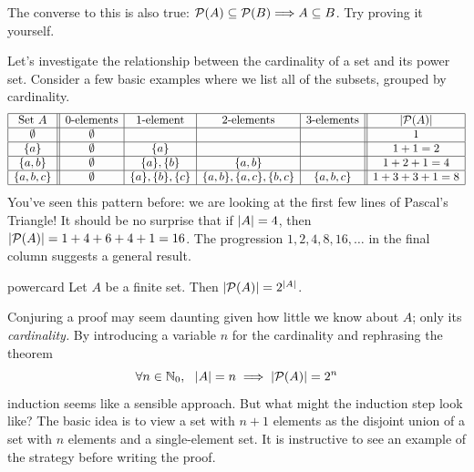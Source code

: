 The converse to this is also true: $\mathcal{P}(A)\subseteq\mathcal{P}(B)\Longrightarrow A\subseteq B$. Try proving it yourself.




Let's investigate the relationship between the cardinality of a set and its power set. Consider a few basic examples where we list all of the subsets, grouped by cardinality.
\[
	\begin{array}{|c||c|c|c|c||c|}
		\hline
		\text{Set }A&\text{0-elements}&\text{1-element}&\text{2-elements}&\text{3-elements}&\left| \mathcal{P}(A)\right|\\\hline
		\emptyset&\emptyset&&&&1\\\hline
		\{a\}&\emptyset&\{a\}&&&1+1=2\\\hline
		\{a,b\}&\emptyset&\{a\},\{b\}&\{a,b\}&&1+2+1=4\\\hline
		\{a,b,c\}&\emptyset&\{a\},\{b\},\{c\}&\{a,b\},\{a,c\},\{b,c\}&\{a,b,c\}&1+3+3+1=8\\\hline
	\end{array}
\]
You've seen this pattern before: we are looking at the first few lines of Pascal's Triangle! It should be no surprise that if $\left| A\right|=4$, then $\left| \mathcal{P}(A)\right|=1+4+6+4+1=16$. The progression $1,2,4,8,16,\ldots$ in the final column suggests a general result.

\begin{thm}{}{powercard}
	Let $A$ be a finite set. Then $\left| \mathcal{P}(A)\right|=2^{\left| A\right|}$.
\end{thm}

Conjuring a proof may seem daunting given how little we know about $A$; only its \emph{cardinality.} By introducing a variable $n$ for the cardinality and rephrasing the theorem
\[
	\forall n\in\mathbb{N}_0,\ \ \left| A\right|=n\implies \left| \mathcal{P}(A)\right|=2^{n}
\]
induction seems like a sensible approach. But what might the induction step look like? The basic idea is to view a set with $n+1$ elements as the disjoint union of a set with $n$ elements and a single-element set. It is instructive to see an example of the strategy before writing the proof. 

